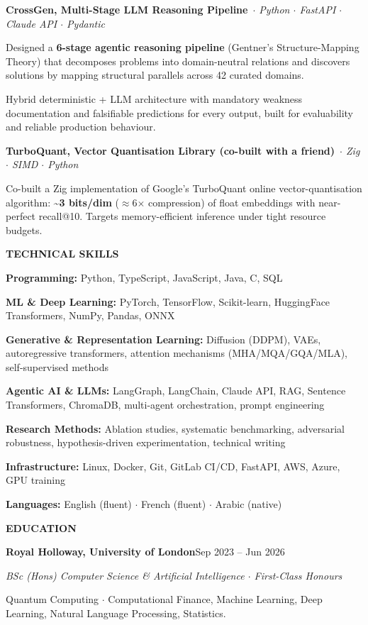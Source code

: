 \documentclass[a4paper,10pt]{article}
\newcommand{\cvsection}[1]{%
  \vspace{7pt}%
  {\bfseries\fontsize{11}{13}\selectfont\MakeUppercase{#1}}\par
  \vspace{1.5pt}{\color{black!75}\hrule height 0.6pt}\vspace{4pt}%
}
\newcommand{\project}[2]{%
  \noindent\textbf{#1}\,\textit{#2}\par\vspace{1pt}%
}
\newcommand{\skill}[2]{\noindent\textbf{#1:} #2\par\vspace{1.5pt}}
\newenvironment{tight}{%
  \begin{list}{\textbullet}{%
    \setlength{\leftmargin}{1.35em}\setlength{\labelsep}{0.5em}%
    \setlength{\itemsep}{1.0pt}\setlength{\parsep}{0pt}\setlength{\topsep}{2.5pt}%
    \setlength{\partopsep}{0pt}}%
}{\end{list}}
\begin{document}
\project{CrossGen, Multi-Stage LLM Reasoning Pipeline}{ $\cdot$ Python $\cdot$ FastAPI $\cdot$ Claude API $\cdot$ Pydantic}
\begin{tight}
  \item Designed a \textbf{6-stage agentic reasoning pipeline} (Gentner's Structure-Mapping Theory) that decomposes problems into domain-neutral relations and discovers solutions by mapping structural parallels across 42 curated domains.
  \item Hybrid deterministic + LLM architecture with mandatory weakness documentation and falsifiable predictions for every output, built for evaluability and reliable production behaviour.
\end{tight}
\vspace{3pt}

\project{TurboQuant, Vector Quantisation Library (co-built with a friend)}{ $\cdot$ Zig $\cdot$ SIMD $\cdot$ Python}
\begin{tight}
  \item Co-built a Zig implementation of Google's TurboQuant online vector-quantisation algorithm: \textbf{\textasciitilde3 bits/dim} ($\approx$6$\times$ compression) of float embeddings with near-perfect recall@10. Targets memory-efficient inference under tight resource budgets.
\end{tight}

\cvsection{Technical Skills}
\skill{Programming}{Python, TypeScript, JavaScript, Java, C, SQL}
\skill{ML \& Deep Learning}{PyTorch, TensorFlow, Scikit-learn, HuggingFace Transformers, NumPy, Pandas, ONNX}
\skill{Generative \& Representation Learning}{Diffusion (DDPM), VAEs, autoregressive transformers, attention mechanisms (MHA/MQA/GQA/MLA), self-supervised methods}
\skill{Agentic AI \& LLMs}{LangGraph, LangChain, Claude API, RAG, Sentence Transformers, ChromaDB, multi-agent orchestration, prompt engineering}
\skill{Research Methods}{Ablation studies, systematic benchmarking, adversarial robustness, hypothesis-driven experimentation, technical writing}
\skill{Infrastructure}{Linux, Docker, Git, GitLab CI/CD, FastAPI, AWS, Azure, GPU training}
\skill{Languages}{English (fluent) $\cdot$ French (fluent) $\cdot$ Arabic (native)}

\cvsection{Education}
\noindent\textbf{Royal Holloway, University of London}\hfill {\color{black!70}Sep 2023 – Jun 2026}\par
\textit{BSc (Hons) Computer Science \& Artificial Intelligence $\cdot$ First-Class Honours}\par
\vspace{2pt}
Quantum Computing $\cdot$ Computational Finance, Machine Learning, Deep Learning, Natural Language Processing, Statistics.
\end{document}
